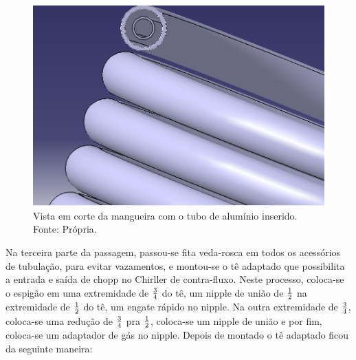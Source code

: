                 \begin{figure}[!htb]
                    \centering
                    \includegraphics[scale= 0.3]{figuras/corte-mangeira.png}
                    \caption{Vista em corte da mangueira com o tubo de alumínio inserido. Fonte: Própria.}
                    \label{vista-mangueira}
                \end{figure}

                Na terceira parte da passagem, passou-se fita veda-rosca em todos os acessórios de
                tubulação, para evitar vazamentos, e montou-se o tê adaptado que possibilita a
                entrada e saída de chopp no Chirller de contra-fluxo. Neste processo,
                coloca-se o espigão em uma extremidade de $3 \over 4$ do tê, um nipple de união
                de $1 \over 2$ na extremidade de $1 \over 2$ do tê, um engate rápido no nipple. Na outra
                extremidade de $3 \over 4$, coloca-se uma redução de $3 \over 4$ pra $1 \over 2$, coloca-se
                um nipple de união e por fim, coloca-se um adaptador de gás no nipple. Depois
                de montado o tê adaptado ficou da seguinte maneira:

